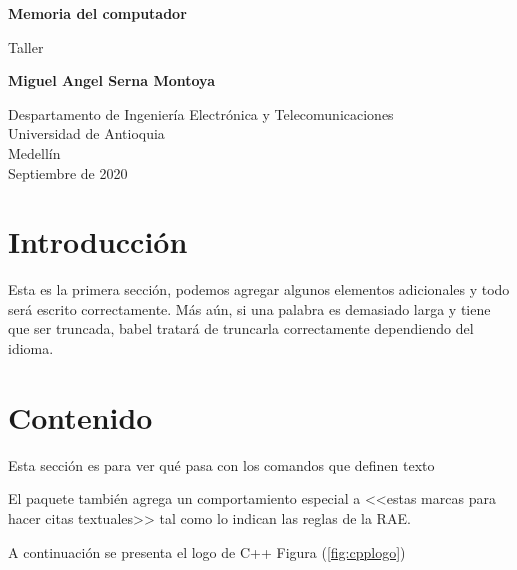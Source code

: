 \documentclass{article}
\begin{document}
\begin{titlepage}
    \begin{center}
        \vspace*{1cm}
            
        \Huge
        \textbf{Memoria del computador}
            
        \vspace{0.5cm}
        \LARGE
        Taller
            
        \vspace{1.5cm}
            
        \textbf{Miguel Angel Serna Montoya}
            
        \vfill
            
        \vspace{0.8cm}
            
        \Large
        Despartamento de Ingeniería Electrónica y Telecomunicaciones\\
        Universidad de Antioquia\\
        Medellín\\
        Septiembre de 2020
            
    \end{center}
\end{titlepage}

\tableofcontents

\section{Introducción} \label{Introducción}
Esta es la primera sección, podemos agregar algunos elementos adicionales y todo será escrito correctamente. Más aún, si una palabra es demasiado larga y tiene que ser truncada, babel tratará de truncarla correctamente dependiendo del idioma.

\section{Contenido} \label{Contenido}

Esta sección es para ver qué pasa con los comandos 
que definen texto

El paquete también agrega un comportamiento especial 
a <<estas marcas para hacer citas textuales>> tal como 
lo indican las reglas de la RAE. \cite{dirac}



A continuación se presenta el logo de C++ Figura (\ref{fig:cpplogo})
\end{document}
